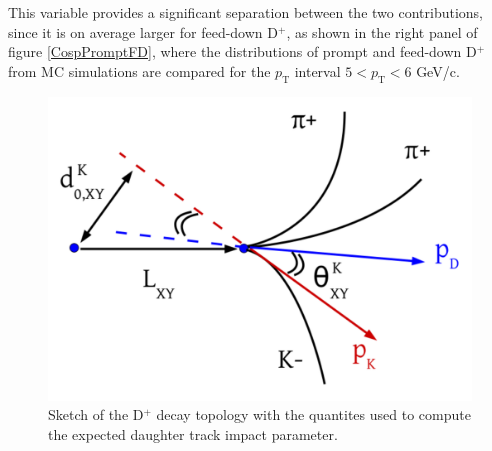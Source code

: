 \documentclass[b5paper,10pt,twoside,oldstyle,classica]{toptesi}
\newcommand{\pt}{p_\text{T}}
\begin{document}
This variable provides a significant separation between the two contributions, since it is on average larger for feed-down D$^+$, as shown in the right panel of figure \ref{CospPromptFD}, where the distributions of prompt and feed-down D$^+$ from MC simulations are compared for the $\pt$ interval $5<\pt<6$ GeV/c.
\begin{figure}[tb]
\begin{center}
\includegraphics[scale = 0.3]{topomatic.pdf}
\caption{Sketch of the D$^+$ decay topology with the quantites used to compute the expected daughter track impact parameter.}
\label{topomatic}
\end{center}
\end{figure}
\end{document}
